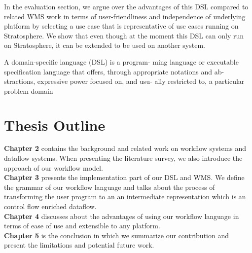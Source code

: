 In the evaluation section, we argue over the advantages of this DSL compared to related WMS work in terms of user-friendliness and independence of underlying platform by selecting a use case that is representative of use cases running on Stratosphere. We show that even though at the moment this DSL can only run on Stratosphere, it can be extended to be used on another system. 

\begin{definition}
A domain-specific language (DSL) is a program- ming language or executable specification language that offers, through appropriate notations and ab- stractions, expressive power focused on, and usu- ally restricted to, a particular problem domain \cite{van2000domain}
\label{def:dsl}
\end{definition}

\section{Thesis Outline}
\textbf{Chapter 2} contains the background and related work on workflow systems and dataflow systems. When presenting the literature survey, we also introduce the approach of our workflow model.\\
\textbf{Chapter 3} presents the implementation part of our DSL and WMS. We define the grammar of our workflow language and talks about the process of transforming the user program to an an intermediate representation which is an control flow enriched dataflow.\\
\textbf{Chapter 4} discusses about the advantages of using our workflow language in terms of ease of use and extensible to any platform.\\
\textbf{Chapter 5} is the conclusion in which we summarize our contribution and present the limitations and potential future work. 